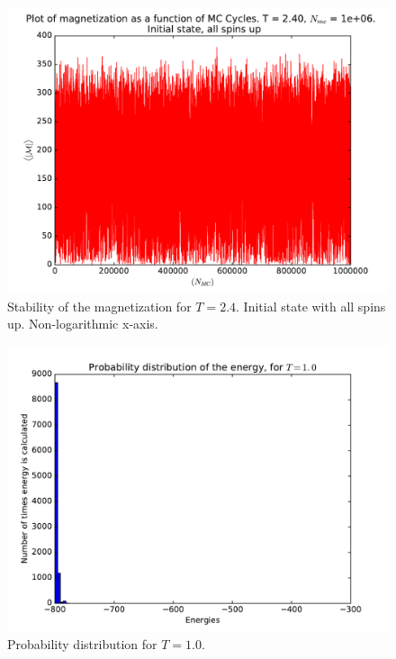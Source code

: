 \documentclass[12pt]{article}
\begin{document}
\begin{figure}[H]
\centering
\includegraphics[width=\linewidth]{Plots/Magnetization_stability_UpInitSpin_T24.pdf}
\caption{Stability of the magnetization for $T=2.4$. Initial state with all spins up. Non-logarithmic x-axis.}
\end{figure}

\begin{figure}[H]
\centering
\includegraphics[width=\linewidth]{Plots/Probability_distribution_T1.pdf}
\caption{Probability distribution for $T=1.0$.}
\end{figure}
\end{document}
